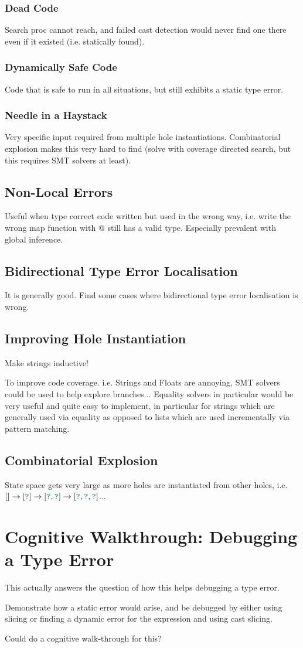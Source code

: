 \subsubsection{Dead Code}
Search proc cannot reach, and failed cast detection would never find one there even if it existed (i.e. statically found).
\subsubsection{Dynamically Safe Code}
Code that is safe to run in all situations, but still exhibits a static type error.

\subsubsection{Needle in a Haystack}
Very specific input required from multiple hole instantiations. Combinatorial explosion makes this very hard to find (solve with coverage directed search, but this requires SMT solvers at least).

\subsection{Non-Local Errors}
Useful when type correct code written but used in the wrong way, i.e. write the wrong map function with @ still has a valid type. Especially prevalent with global inference.
\subsection{Bidirectional Type Error Localisation}
It is generally good. Find some cases where bidirectional type error localisation is wrong.
\subsection{Improving Hole Instantiation}
\label{sec:EvalHoleInstantiation}
Make strings inductive!

To improve code coverage. i.e. Strings and Floats are annoying, SMT solvers could be used to help explore branches... Equality solvers in particular would be very useful and quite easy to implement, in particular for strings which are generally used via equality as opposed to lists which are used incrementally via pattern matching.
\subsection{Combinatorial Explosion}
State space gets very large as more holes are instantiated from other holes, i.e. $[] \to [{\color{teal}\texttt{?}}] \to [{\color{teal}\texttt{?}}, {\color{teal}\texttt{?}}] \to [{\color{teal}\texttt{?}},{\color{teal}\texttt{?}},{\color{teal}\texttt{?}}]$...

\section{Cognitive Walkthrough: Debugging a Type Error}
\label{sec:CognitiveWalkthrough}
This actually answers the question of how this helps debugging a type error.

Demonstrate how a static error would arise, and be debugged by either using slicing or finding a dynamic error for the expression and using cast slicing.

Could do a cognitive walk-through for this?
